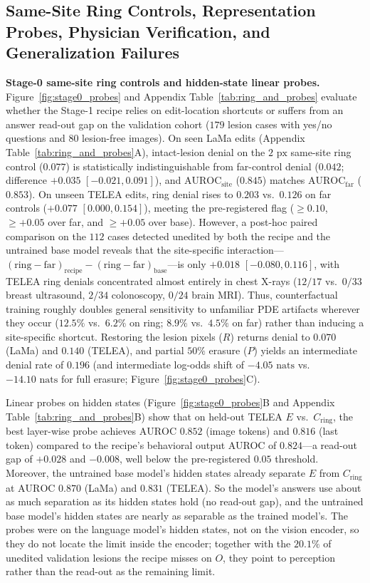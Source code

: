 \documentclass{article} %
\begin{document}
\subsection{Same-Site Ring Controls, Representation Probes, Physician Verification, and Generalization Failures}
\label{subsec:exp_probes_readers_failures}
\textbf{Stage-0 same-site ring controls and hidden-state linear probes.} Figure~\ref{fig:stage0_probes} and Appendix Table~\ref{tab:ring_and_probes} evaluate whether the Stage-1 recipe relies on edit-location shortcuts or suffers from an answer read-out gap on the validation cohort ($179$ lesion cases with yes/no questions and $80$ lesion-free images). On seen LaMa edits (Appendix Table~\ref{tab:ring_and_probes}A), intact-lesion denial on the $2\text{ px}$ same-site ring control ($0.077$) is statistically indistinguishable from far-control denial ($0.042$; difference $+0.035$ $[-0.021, 0.091]$), and $\text{AUROC}_{\text{site}}$ ($0.845$) matches $\text{AUROC}_{\text{far}}$ ($0.853$). On unseen TELEA edits, ring denial rises to $0.203$ vs.\ $0.126$ on far controls ($+0.077$ $[0.000, 0.154]$), meeting the pre-registered flag ($\ge 0.10$, $\ge +0.05$ over far, and $\ge +0.05$ over base). However, a post-hoc paired comparison on the $112$ cases detected unedited by both the recipe and the untrained base model reveals that the site-specific interaction---$(\text{ring} - \text{far})_{\text{recipe}} - (\text{ring} - \text{far})_{\text{base}}$---is only $+0.018$ $[-0.080, 0.116]$, with TELEA ring denials concentrated almost entirely in chest X-rays ($12/17$ vs.\ $0/33$ breast ultrasound, $2/34$ colonoscopy, $0/24$ brain MRI). Thus, counterfactual training roughly doubles general sensitivity to unfamiliar PDE artifacts wherever they occur ($12.5\%$ vs.\ $6.2\%$ on ring; $8.9\%$ vs.\ $4.5\%$ on far) rather than inducing a site-specific shortcut. Restoring the lesion pixels ($R$) returns denial to $0.070$ (LaMa) and $0.140$ (TELEA), and partial $50\%$ erasure ($P$) yields an intermediate denial rate of $0.196$ (and intermediate log-odds shift of $-4.05\text{ nats}$ vs.\ $-14.10\text{ nats}$ for full erasure; Figure~\ref{fig:stage0_probes}C).

Linear probes on hidden states (Figure~\ref{fig:stage0_probes}B and Appendix Table~\ref{tab:ring_and_probes}B) show that on held-out TELEA $E$ vs.\ $C_{\text{ring}}$, the best layer-wise probe achieves $\text{AUROC } 0.852$ (image tokens) and $0.816$ (last token) compared to the recipe's behavioral output AUROC of $0.824$---a read-out gap of $+0.028$ and $-0.008$, well below the pre-registered $0.05$ threshold. Moreover, the untrained base model's hidden states already separate $E$ from $C_{\text{ring}}$ at $\text{AUROC } 0.870$ (LaMa) and $0.831$ (TELEA). So the model's answers use about as much separation as its hidden states hold (no read-out gap), and the untrained base model's hidden states are nearly as separable as the trained model's. The probes were on the language model's hidden states, not on the vision encoder, so they do not locate the limit inside the encoder; together with the $20.1\%$ of unedited validation lesions the recipe misses on $O$, they point to perception rather than the read-out as the remaining limit.
\end{document}
